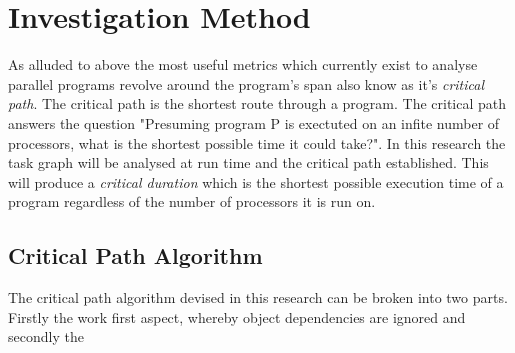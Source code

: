 \section{Investigation Method}
As alluded to above the most useful metrics which currently exist to analyse parallel programs revolve around 
the program's span also know as it's \emph{critical path}. The critical path is the shortest route through a program. 
The critical path answers the question "Presuming program P is exectuted on an infite number of processors, 
what is the shortest possible time it could take?". In this research the task graph will be analysed at run time 
and the critical path established. This will produce a \emph{critical duration} which is the shortest possible execution time of a program regardless of the number of processors it is run on.

\subsection{}

\subsection{Critical Path Algorithm}
The critical path algorithm devised in this research can be broken into two parts. Firstly the work first aspect, whereby object dependencies are ignored and secondly the 
\subsection{}